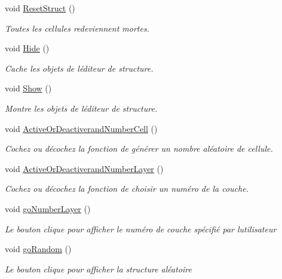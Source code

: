 \begin{DoxyCompactItemize}
void \mbox{\hyperlink{class_edit_mode_manager_afc8be75da1a5042fcf78b0e9bf1e2108}{Reset\+Struct}} ()
\begin{DoxyCompactList}\small\item\em Toutes les cellules redeviennent mortes. \end{DoxyCompactList}\item 
void \mbox{\hyperlink{class_edit_mode_manager_aacc30d9cdb3d747fbad20130903ec24e}{Hide}} ()
\begin{DoxyCompactList}\small\item\em Cache les objets de l\textquotesingle{}éditeur de structure. \end{DoxyCompactList}\item 
void \mbox{\hyperlink{class_edit_mode_manager_acf80baac30f6611bcb1bf97b61ffc1ca}{Show}} ()
\begin{DoxyCompactList}\small\item\em Montre les objets de l\textquotesingle{}éditeur de structure. \end{DoxyCompactList}\item 
void \mbox{\hyperlink{class_edit_mode_manager_ac9e73b653a4af1d833a2df57c45cf4cf}{Active\+Or\+Deactiverand\+Number\+Cell}} ()
\begin{DoxyCompactList}\small\item\em Cochez ou décochez la fonction de générer un nombre aléatoire de cellule. \end{DoxyCompactList}\item 
void \mbox{\hyperlink{class_edit_mode_manager_ab1048ff448edf1c84b42abb9a811d0ae}{Active\+Or\+Deactiverand\+Number\+Layer}} ()
\begin{DoxyCompactList}\small\item\em Cochez ou décochez la fonction de choisir un numéro de la couche. \end{DoxyCompactList}\item 
void \mbox{\hyperlink{class_edit_mode_manager_ac7d44060ec1a703a7f9ea15ecf13d2cf}{go\+Number\+Layer}} ()
\begin{DoxyCompactList}\small\item\em Le bouton clique pour afficher le numéro de couche spécifié par l\textquotesingle{}utilisateur \end{DoxyCompactList}\item 
void \mbox{\hyperlink{class_edit_mode_manager_a96ee789fb9bf31726bf942d334775a92}{go\+Random}} ()
\begin{DoxyCompactList}\small\item\em Le bouton clique pour afficher la structure aléatoire \end{DoxyCompactList}\item 

\end{DoxyCompactItemize}

